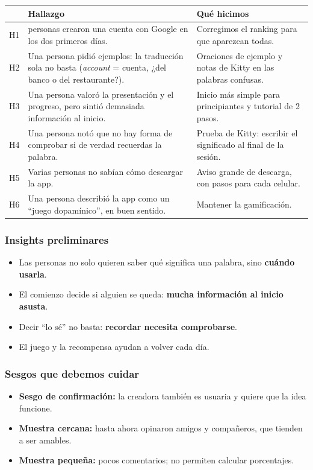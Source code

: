 \begin{center}
\small
\begin{tabularx}{\linewidth}{>{\raggedright\arraybackslash}p{.05\linewidth}>{\raggedright\arraybackslash}X>{\raggedright\arraybackslash}X}
\toprule
 & \textbf{Hallazgo} & \textbf{Qué hicimos} \\
\midrule
H1 & 13 personas crearon una cuenta con Google en los dos primeros días. & Corregimos el ranking para que aparezcan todas. \\
H2 & Una persona pidió ejemplos: la traducción sola no basta (\emph{account} = cuenta, ¿del banco o del restaurante?). & Oraciones de ejemplo y notas de Kitty en las palabras confusas. \\
H3 & Una persona valoró la presentación y el progreso, pero sintió demasiada información al inicio. & Inicio más simple para principiantes y tutorial de 2 pasos. \\
H4 & Una persona notó que no hay forma de comprobar si de verdad recuerdas la palabra. & Prueba de Kitty: escribir el significado al final de la sesión. \\
H5 & Varias personas no sabían cómo descargar la app. & Aviso grande de descarga, con pasos para cada celular. \\
H6 & Una persona describió la app como un \enquote{juego dopamínico}, en buen sentido. & Mantener la gamificación. \\
\bottomrule
\end{tabularx}
\end{center}

\subsubsection{Insights preliminares}
\begin{hipotesis}
\begin{itemize}
  \item Las personas no solo quieren saber qué significa una palabra, sino \textbf{cuándo usarla}.
  \item El comienzo decide si alguien se queda: \textbf{mucha información al inicio asusta}.
  \item Decir \enquote{lo sé} no basta: \textbf{recordar necesita comprobarse}.
  \item El juego y la recompensa ayudan a volver cada día.
\end{itemize}
\end{hipotesis}

\subsubsection{Sesgos que debemos cuidar}
\begin{itemize}
  \item \textbf{Sesgo de confirmación:} la creadora también es usuaria y quiere que la idea funcione.
  \item \textbf{Muestra cercana:} hasta ahora opinaron amigos y compañeros, que tienden a ser amables.
  \item \textbf{Muestra pequeña:} pocos comentarios; no permiten calcular porcentajes.
\end{itemize}

